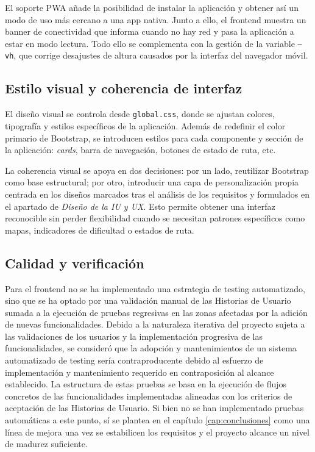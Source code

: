 El soporte PWA añade la posibilidad de instalar la aplicación y obtener así un modo de uso más cercano a una app nativa. Junto a ello, el frontend muestra un banner de conectividad que informa cuando no hay red y pasa la aplicación a estar en modo lectura. Todo ello se complementa con la gestión de la variable \texttt{--vh}, que corrige desajustes de altura causados por la interfaz del navegador móvil.

\subsection{Estilo visual y coherencia de interfaz}

El diseño visual se controla desde \texttt{global.css}, donde se ajustan colores, tipografía y estilos específicos de la aplicación. Además de redefinir el color primario de Bootstrap, se introducen estilos para  cada componente y sección de la aplicación: \textit{cards}, barra de navegación, botones de estado de ruta, etc.

La coherencia visual se apoya en dos decisiones: por un lado, reutilizar Bootstrap como base estructural; por otro, introducir una capa de personalización propia centrada en los diseños marcados tras el análisis de los requisitos y formulados en el apartado de \textit{Diseño de la IU y UX}. Esto permite obtener una interfaz reconocible sin perder flexibilidad cuando se necesitan patrones específicos como mapas, indicadores de dificultad o estados de ruta.

\subsection{Calidad y verificación}

Para el frontend no se ha implementado una estrategia de testing automatizado, sino que se ha optado por una validación manual de las Historias de Usuario sumada a la ejecución de pruebas regresivas en las zonas afectadas por la adición de nuevas funcionalidades. Debido a la naturaleza iterativa del proyecto sujeta a las validaciones de los usuarios y la implementación progresiva de las funcionalidades, se consideró que la adopción y mantenimientos de un sistema automatizado de testing sería contraproducente debido al esfuerzo de implementación y mantenimiento requerido en contraposición al alcance establecido. La estructura de estas pruebas se basa en la ejecución de flujos concretos de las funcionalidades implementadas alineadas con los criterios de aceptación de las Historias de Usuario. Si bien no se han implementado pruebas automáticas a este punto, sí se plantea en el capítulo \ref{cap:conclusiones} como una línea de mejora una vez se estabilicen los requisitos y el proyecto alcance un nivel de madurez suficiente.


